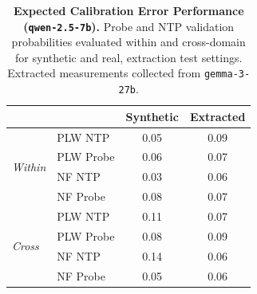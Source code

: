 \begin{table}[ht]
\centering
\begin{tabular}{ll cc}
\toprule
& & Synthetic & Extracted \\
\midrule
\multirow{4}{*}{\textit{Within}}
& PLW NTP & 0.05 & 0.09 \\
& PLW Probe & 0.06 & 0.07 \\
& NF NTP & 0.03 & 0.06 \\
& NF Probe & 0.08 & 0.07 \\
\midrule
\multirow{4}{*}{\textit{Cross}}
& PLW NTP & 0.11 & 0.07 \\
& PLW Probe & 0.08 & 0.09 \\
& NF NTP & 0.14 & 0.06 \\
& NF Probe & 0.05 & 0.06 \\
\bottomrule
\end{tabular}
\caption{\textbf{Expected Calibration Error Performance (\texttt{qwen-2.5-7b}).} Probe and NTP validation probabilities evaluated within and cross-domain for synthetic and real, extraction test settings. Extracted measurements collected from \texttt{gemma-3-27b}.}
\label{tab:qwen-2.5-7b-gemma-3-27b}
\end{table}
